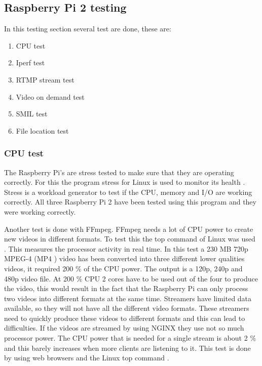 \documentclass{sig-alternate-br}
\begin{document}
\subsection{Raspberry Pi 2  testing}

In this testing section several test are done, these are: 
\begin{enumerate}[topsep=0pt,itemsep=-1ex,partopsep=1ex,parsep=1ex] 
	\item CPU test
	\item Iperf test
	\item RTMP stream test
	\item Video on demand test
	\item SMIL test
	\item File location test
\end{enumerate}

\subsubsection{CPU test}

The Raspberry Pi's are stress tested to make sure that they are operating correctly. For this the program stress for Linux is used to monitor its health \cite{stress}. Stress is a workload generator to test if the CPU, memory and I/O are working correctly. All three Raspberry Pi 2 have been tested using this program and they were working correctly. 

Another test is done with FFmpeg. FFmpeg needs a lot of CPU power to create new videos in different formats. To test this the top command of Linux was used \cite{top}. This measures the processor activity in real time. In this test a 230 MB 720p MPEG-4 (MP4 ) video has been converted into three different lower qualities videos, it required 200 \% of the CPU power. The output is a 120p, 240p and 480p video file. At 200 \% CPU 2 cores have to be used out of the four to produce the video, this would result in the fact that the Raspberry Pi can only process two videos into different formats at the same time. Streamers have limited data available, so they will not have all the different video formats. These streamers need to quickly produce these videos to different formats and this can lead to difficulties.  \newline
If the videos are streamed by using NGINX they use not so much processor power. The CPU power that is needed for a single stream is about 2 \% and this barely increases when more clients are listening to it. This test is done by using web browsers and the Linux top command \cite{top}. 
\end{document}
